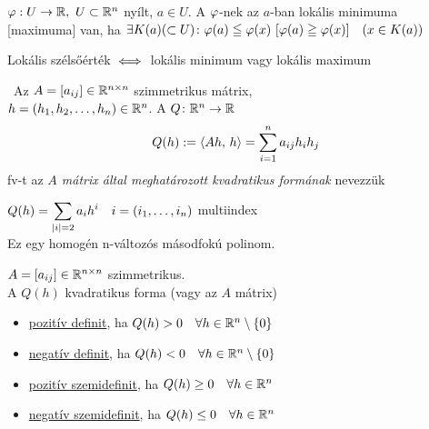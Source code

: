 \begin{de}
  $\varphi: U\to\mathbb{R},\ U\subset \mathbb{R}^n$ nyílt, $a\in U$. A $\varphi$-nek az $a$-ban lokális minimuma [maximuma] van, ha $\exists
  K(a) (\subset U)\colon \varphi(a) \leqq \varphi(x) \ [\varphi(a) \geqq \varphi(x)]  \quad(x\in K(a))$
\end{de}
\begin{megj}
  Lokális szélsőérték $\iff$ lokális minimum vagy lokális maximum
\end{megj}

\begin{de}\ 
  Az $A=[a_{ij}]\in\mathbb{R}^{n\times n}$ szimmetrikus mátrix,\\ $h=(h_1,h_2,\dotsc,h_n)\in\mathbb{R}^n$. A  $Q\colon \mathbb{R}^n\to\mathbb{R}$
  \[ Q(h) := \langle Ah,\,h\rangle = \sum_{i=1}^n a_{ij}h_ih_j\]
  fv-t az \emph{$A$ mátrix által meghatározott kvadratikus formának} nevezzük 
\end{de}

\begin{megj}
  $\displaystyle Q(h) = \sum_{|i|=2}a_ih^i\quad i=(i_1,\dotsc,i_n)$ multiindex\\
  Ez egy homogén n-változós másodfokú polinom.
\end{megj}
\begin{de}
  $A=[a_{ij}]\in\mathbb{R}^{n\times n}$ szimmetrikus.\\
  A $Q(h)$ kvadratikus forma (vagy az $A$ mátrix)
  \begin{itemize}[\quad]
  \item \underline{pozitív definit}, ha $Q(h)>0\quad\forall h\in\mathbb{R}^n\setminus\{0\}$
  \item \underline{negatív definit}, ha $Q(h)<0\quad\forall h\in\mathbb{R}^n\setminus\{0\}$
  \item \underline{pozitív szemidefinit}, ha $Q(h)\geq0\quad\forall h\in\mathbb{R}^n$
  \item \underline{negatív szemidefinit}, ha $Q(h)\leq0\quad\forall h\in\mathbb{R}^n$
  \end{itemize}
\end{de}


